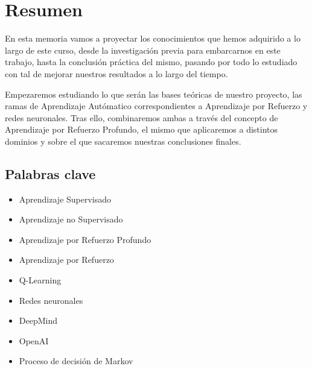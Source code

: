\chapter*{Resumen}

En esta memoria vamos a proyectar los conocimientos que hemos adquirido a lo largo de este curso, desde la investigación previa para embarcarnos en este trabajo, hasta la conclusión práctica del mismo, pasando por todo lo estudiado con tal de mejorar nuestros resultados a lo largo del tiempo.

Empezaremos estudiando lo que serán las bases teóricas de nuestro proyecto, las ramas de Aprendizaje Autómatico correspondientes a Aprendizaje por Refuerzo y redes neuronales. Tras ello, combinaremos ambas a través del concepto de Aprendizaje por Refuerzo Profundo, el mismo que aplicaremos a distintos dominios y sobre el que sacaremos nuestras conclusiones finales.



\section*{Palabras clave}
   
\begin{itemize}
    \item Aprendizaje Supervisado
    \item Aprendizaje no Supervisado
    \item Aprendizaje por Refuerzo Profundo
    \item Aprendizaje por Refuerzo
    \item Q-Learning
    \item Redes neuronales
    \item DeepMind 
    \item OpenAI
    \item Proceso de decisión de Markov
\end{itemize}